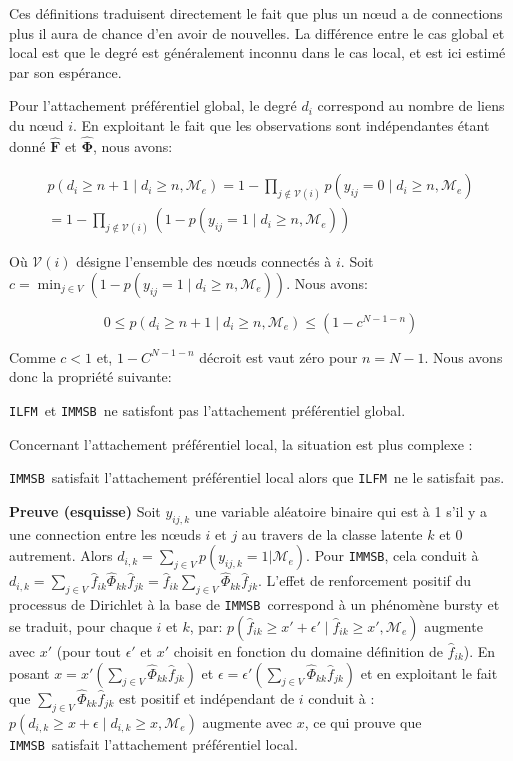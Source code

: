 \documentclass[french]{hermes-journal}
\newcommand{\ilfm}{\texttt{ILFM}}
\newcommand{\immsb}{\texttt{IMMSB}}
\newcommand{\pr}{p}
\newcommand{\mat}[1]{\bm{#1}}
\begin{document}
Ces définitions traduisent directement le fait que plus un n\oe{}ud a de connections plus il aura de chance d'en avoir de nouvelles. La différence entre le cas global et local est que le degré est généralement inconnu dans le cas local, et est ici estimé par son espérance.

Pour l'attachement préférentiel global, le degré $d_i$ correspond au nombre de liens du n\oe{}ud $i$. En exploitant le fait que les observations sont indépendantes étant donné $\mat{\hat{F}}$ et $\mat{\hat{\Phi}}$, nous avons:


\begin{align}
\pr(d_{i} \ge n+1 \mid d_{i} \ge n, \mathcal{M}_e) = 1 - \prod_{j \notin \mathcal{V}(i)} p(y_{ij} = 0 \mid d_{i} \ge n, \mathcal{M}_e) \nonumber \\
= 1 - \prod_{j \notin \mathcal{V}(i)} (1 - p(y_{ij} = 1 \mid d_{i} \ge n, \mathcal{M}_e)) \nonumber
\end{align}

Où $\mathcal{V}(i)$ désigne l'ensemble des n\oe{}uds connectés à $i$. Soit $c=\min_{j \in V}  (1-p(y_{ij} = 1 \mid d_{i} \ge n, \mathcal{M}_e))$. Nous avons:

\[
0 \le \pr(d_{i} \ge n+1 \mid d_{i} \ge n, \mathcal{M}_e) \le (1 - c^{N-1-n})
\]

Comme $c < 1$ et, $1- C^{N-1-n}$ décroit est vaut zéro pour $n=N-1$. Nous avons donc la propriété suivante:

\begin{proposition}[]
\label{pref-attch-glob}
\ilfm\ et \immsb\ ne satisfont pas l'attachement préférentiel global.
\end{proposition}

Concernant l'attachement préférentiel local, la situation est plus complexe :

\begin{proposition}[]
\label{pref-attch-loc}
\immsb\ satisfait l'attachement préférentiel local alors que \ilfm\ ne le satisfait pas.
\end{proposition}

\noindent \textbf{Preuve (esquisse)} Soit $y_{ij,k}$ une variable aléatoire binaire qui est à 1 s'il y a   une connection entre les n\oe{}uds $i$ et $j$ au travers de la classe latente $k$ et 0 autrement.
Alors $d_{i,k} = \sum_{j \in V} \pr(y_{ij,k} =1 | \mathcal{M}_e)$.
Pour \immsb, cela conduit à $d_{i,k} = \sum_{j \in V} \hat{f}_{ik} \hat{\Phi}_{kk} \hat{f}_{jk} = \hat{f}_{ik} \sum_{j \in V} \hat{\Phi}_{kk} \hat{f}_{jk}$.
L'effet de renforcement positif du processus de Dirichlet \cite{HDP} à la base de \immsb\ correspond à un phénomène bursty et se traduit, pour chaque $i$ et $k$, par: $\pr(\hat{f}_{ik} \ge x'+\epsilon' \mid \hat{f}_{ik} \ge x',\mathcal{M}_e)$ augmente avec  $x'$ (pour tout $\epsilon'$ et $x'$ choisit en fonction du domaine définition de  $\hat{f}_{ik}$).
En posant $x=x'(\sum_{j\in V} \hat{\Phi}_{kk} \hat{f}_{jk})$ et $\epsilon = \epsilon'(\sum_{j\in V} \hat{\Phi}_{kk} \hat{f}_{jk})$ et en exploitant le fait que $\sum_{j\in V} \hat{\Phi}_{kk} \hat{f}_{jk}$ est positif et indépendant de $i$ conduit à : $\pr(d_{i,k} \ge x+\epsilon \mid d_{i,k} \ge x, \mathcal{M}_e)$ augmente avec $x$, ce qui prouve que \immsb\ satisfait l'attachement préférentiel local.
\end{document}
